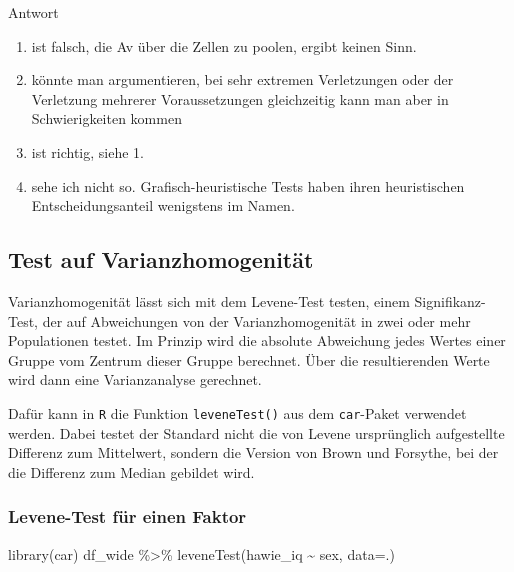 \documentclass[
]{book}
\newenvironment{Shaded}{\begin{snugshade}}{\end{snugshade}}
\newcommand{\AttributeTok}[1]{\textcolor[rgb]{0.77,0.63,0.00}{#1}}
\newcommand{\FunctionTok}[1]{\textcolor[rgb]{0.00,0.00,0.00}{#1}}
\newcommand{\NormalTok}[1]{#1}
\newcommand{\SpecialCharTok}[1]{\textcolor[rgb]{0.00,0.00,0.00}{#1}}
\providecommand{\tightlist}{%
  \setlength{\itemsep}{0pt}\setlength{\parskip}{0pt}}
\begin{document}
Antwort

\begin{enumerate}
\def\labelenumi{\arabic{enumi}.}
\tightlist
\item
  ist falsch, die Av über die Zellen zu poolen, ergibt keinen Sinn.
\item
  könnte man argumentieren, bei sehr extremen Verletzungen oder der Verletzung mehrerer Voraussetzungen gleichzeitig kann man aber in Schwierigkeiten kommen
\item
  ist richtig, siehe 1.
\item
  sehe ich nicht so. Grafisch-heuristische Tests haben ihren heuristischen Entscheidungsanteil wenigstens im Namen.
\end{enumerate}

\hypertarget{test-auf-varianzhomogenituxe4t}{%
\subsection{Test auf Varianzhomogenität}\label{test-auf-varianzhomogenituxe4t}}

Varianzhomogenität lässt sich mit dem Levene-Test testen, einem Signifikanz-Test, der auf Abweichungen von der Varianzhomogenität in zwei oder mehr Populationen testet.
Im Prinzip wird die absolute Abweichung jedes Wertes einer Gruppe vom Zentrum dieser Gruppe berechnet. Über die resultierenden Werte wird dann eine Varianzanalyse gerechnet.

Dafür kann in \texttt{R} die Funktion \texttt{leveneTest()} aus dem \texttt{car}-Paket verwendet werden. Dabei testet der Standard nicht die von Levene ursprünglich aufgestellte Differenz zum Mittelwert, sondern die Version von Brown und Forsythe, bei der die Differenz zum Median gebildet wird.

\hypertarget{levene-test-fuxfcr-einen-faktor}{%
\subsubsection{Levene-Test für einen Faktor}\label{levene-test-fuxfcr-einen-faktor}}

\begin{Shaded}
\begin{Highlighting}[]
\FunctionTok{library}\NormalTok{(car)}
\NormalTok{df\_wide }\SpecialCharTok{\%\textgreater{}\%} 
  \FunctionTok{leveneTest}\NormalTok{(hawie\_iq }\SpecialCharTok{\textasciitilde{}}\NormalTok{ sex, }\AttributeTok{data=}\NormalTok{.)}
\end{Highlighting}
\end{Shaded}
\end{document}

